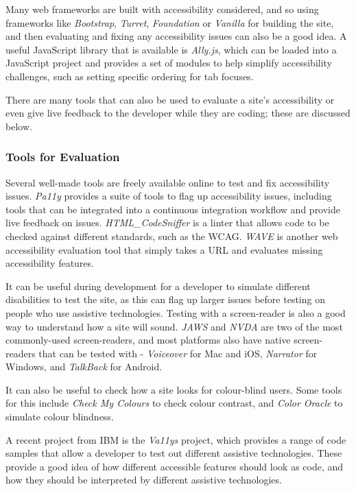 \documentclass[ %
                    author={Aleena Baig},
                supervisor={Dr Simon Lock},
                    degree={BSc},
                     title={On Making Web Accessible Graphs},
                  subtitle={},
                      year={2019} ]{dissertation}
\begin{document}
Many web frameworks are built with accessibility considered, and so using frameworks like \textit{Bootstrap}, \textit{Turret}, \textit{Foundation} or \textit{Vanilla} for building the site, and then evaluating and fixing any accessibility issues can also be a good idea. A useful JavaScript library that is available is \textit{Ally.js}, which can be loaded into a JavaScript project and provides a set of modules to help simplify accessibility challenges, such as setting specific ordering for tab focuses.

There are many tools that can also be used to evaluate a site's accessibility or even give live feedback to the developer while they are coding; these are discussed below.

\subsubsection{Tools for Evaluation}

Several well-made tools are freely available online to test and fix accessibility issues. \textit{Pa11y} provides a suite of tools to flag up accessibility issues, including tools that can be integrated into a continuous integration workflow and provide live feedback on issues. \textit{HTML\_CodeSniffer} is a linter that allows code to be checked against different standards, such as the WCAG. \textit{WAVE} is another web accessibility evaluation tool that simply takes a URL and evaluates missing accessibility features.

It can be useful during development for a developer to simulate different disabilities to test the site, as this can flag up larger issues before testing on people who use assistive technologies. Testing with a screen-reader is also a good way to understand how a site will sound. \textit{JAWS} and \textit{NVDA} are two of the most commonly-used screen-readers, and most platforms also have native screen-readers that can be tested with - \textit{Voiceover} for Mac and iOS, \textit{Narrator} for Windows, and \textit{TalkBack} for Android.

It can also be useful to check how a site looks for colour-blind users. Some tools for this include \textit{Check My Colours} to check colour contrast, and \textit{Color Oracle} to simulate colour blindness.

A recent project from IBM is the \textit{Va11ys} project, which provides a range of code samples that allow a developer to test out different assistive technologies. These provide a good idea of how different accessible features should look as code, and how they should be interpreted by different assistive technologies.
\end{document}

